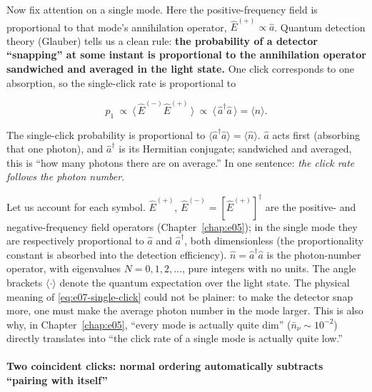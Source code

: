 Now fix attention on a single mode. Here the positive-frequency field is proportional to that mode's annihilation operator, \(\hat E^{(+)}\propto\hat a\). Quantum detection theory (Glauber) tells us a clean rule: \textbf{the probability of a detector ``snapping'' at some instant is proportional to the annihilation operator sandwiched and averaged in the light state.} One click corresponds to one absorption, so the single-click rate is proportional to

\begin{equation}
  p_1\ \propto\ \big\langle\,\hat E^{(-)}\hat E^{(+)}\,\big\rangle
  \ \propto\ \big\langle\,\hat a^\dagger\hat a\,\big\rangle
  =\langle\hat n\rangle .
  \label{eq:e07-single-click}
\end{equation}
\begin{formulaexplain}
The single-click probability is proportional to \(\langle\hat a^\dagger\hat a\rangle=\langle\hat n\rangle\). \(\hat a\) acts first (absorbing that one photon), and \(\hat a^\dagger\) is its Hermitian conjugate; sandwiched and averaged, this is ``how many photons there are on average.'' In one sentence: \emph{the click rate follows the photon number}.
\end{formulaexplain}

Let us account for each symbol. \(\hat E^{(+)}\), \(\hat E^{(-)}=[\hat E^{(+)}]^\dagger\) are the positive- and negative-frequency field operators (Chapter~\ref{chap:e05}); in the single mode they are respectively proportional to \(\hat a\) and \(\hat a^\dagger\), both dimensionless (the proportionality constant is absorbed into the detection efficiency). \(\hat n=\hat a^\dagger\hat a\) is the photon-number operator, with eigenvalues \(N=0,1,2,\dots\), pure integers with no units. The angle brackets \(\langle\cdot\rangle\) denote the quantum expectation over the light state. The physical meaning of \eqref{eq:e07-single-click} could not be plainer: to make the detector snap more, one must make the average photon number in the mode larger. This is also why, in Chapter~\ref{chap:e05}, ``every mode is actually quite dim'' (\(\bar n_\nu\sim10^{-2}\)) directly translates into ``the click rate of a single mode is actually quite low.''

\paragraph{Two coincident clicks: normal ordering automatically subtracts ``pairing with itself''}
\label{sec:e07-normal-ordering}

